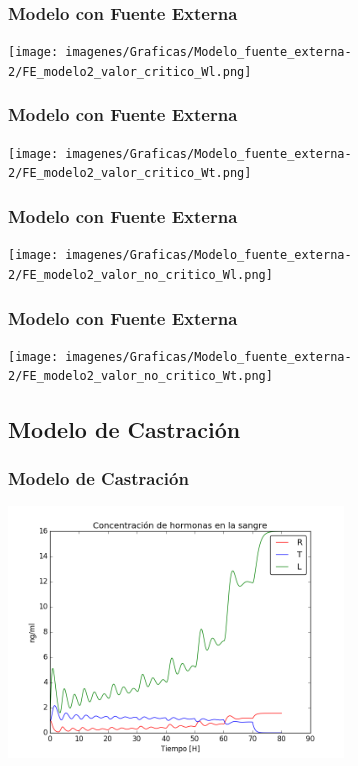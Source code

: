 \documentclass[10pt]{beamer}
\begin{document}
\begin{frame}
\frametitle{Modelo con Fuente Externa}
\begin{center}
 \texttt{[image: imagenes/Graficas/Modelo\_fuente\_externa-2/FE\_modelo2\_valor\_critico\_Wl.png]}
\end{center}
\end{frame}


\begin{frame}
\frametitle{Modelo con Fuente Externa}
\begin{center}
 \texttt{[image: imagenes/Graficas/Modelo\_fuente\_externa-2/FE\_modelo2\_valor\_critico\_Wt.png]}
\end{center}
\end{frame}

\begin{frame}
\frametitle{Modelo con Fuente Externa}
\begin{center}
 \texttt{[image: imagenes/Graficas/Modelo\_fuente\_externa-2/FE\_modelo2\_valor\_no\_critico\_Wl.png]}
\end{center}
\end{frame}


\begin{frame}
\frametitle{Modelo con Fuente Externa}
\begin{center}
 \texttt{[image: imagenes/Graficas/Modelo\_fuente\_externa-2/FE\_modelo2\_valor\_no\_critico\_Wt.png]}
\end{center}
\end{frame}


\subsection{Modelo de Castración}

\begin{frame}
\frametitle{Modelo de Castración}
\begin{center}
 \includegraphics[width=3.5in]{imagenes/Graficas/Castracion/castracion_hormonas_primer_modelo_m_8.png}
\end{center}
\end{frame}
\end{document}
